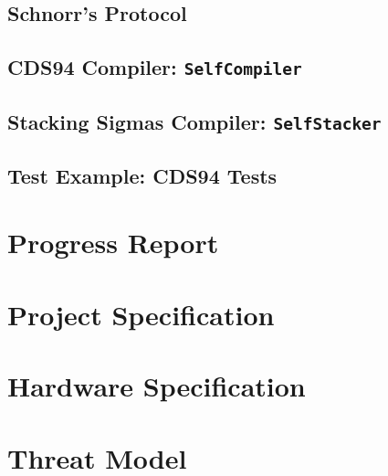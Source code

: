 \section{Schnorr's Protocol}\label{code:schnorr}


\section{CDS94 Compiler: \texttt{SelfCompiler}}\label{code:cds}


\section{Stacking Sigmas Compiler: \texttt{SelfStacker}}\label{code:stacksig}


\section{Test Example: CDS94 Tests}\label{code:cds-tests}


\chapter{Progress Report}\label{ch:progress-report}


\chapter{Project Specification}


\chapter{Hardware Specification}
\label{sec:hardware-spec}



\chapter{Threat Model}
\label{sec:threat-model-appendix}
